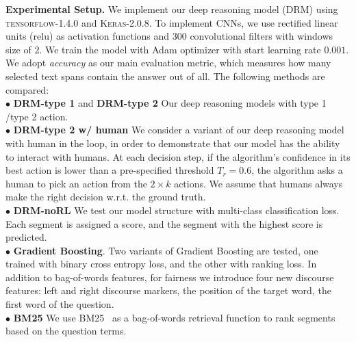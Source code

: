
\textbf{Experimental Setup.}
We implement our deep reasoning model (DRM) using \textsc{tensorflow-1.4.0} and \textsc{Keras-2.0.8}. To implement CNNs, we use rectified linear units (relu) as activation functions and 300 convolutional filters with windows size of 2. We train the model with Adam optimizer with start learning rate $0.001$. We adopt \emph{accuracy} as our main evaluation metric, which measures how many selected text spans contain the answer out of all. The following  methods are compared:\\
$\bullet$ \textbf{DRM-type 1} and \textbf{DRM-type 2} Our deep reasoning models with type 1 /type 2 action. \\
$\bullet$  \textbf{DRM-type 2 w/ human} We consider a variant of our deep reasoning model with human in the loop, in order to demonstrate that our model has the ability to interact with humans. At each decision step, if the algorithm's confidence in its best action is lower than a pre-specified threshold $T_r=0.6$, the algorithm asks a human to pick an action from the $2\times k$ actions. We assume that humans always make the right decision w.r.t. the ground truth.  \\
$\bullet$  \textbf{DRM-noRL} We test our model structure with multi-class classification loss. Each segment is assigned a score, and the segment with the highest score is predicted. \\
 $\bullet$  \textbf{Gradient Boosting}. 
Two variants of Gradient Boosting are tested, one trained with binary cross entropy loss, and the other with ranking loss. In addition to bag-of-words features, for fairness we introduce four new discourse features: left and right discourse markers, the position of the target word, the first word of the question.\\
$\bullet$  \textbf{BM25} We use BM25~\cite{DBLP:journals/ftir/RobertsonZ09} as a bag-of-words retrieval function to rank segments based on the question terms. \\
